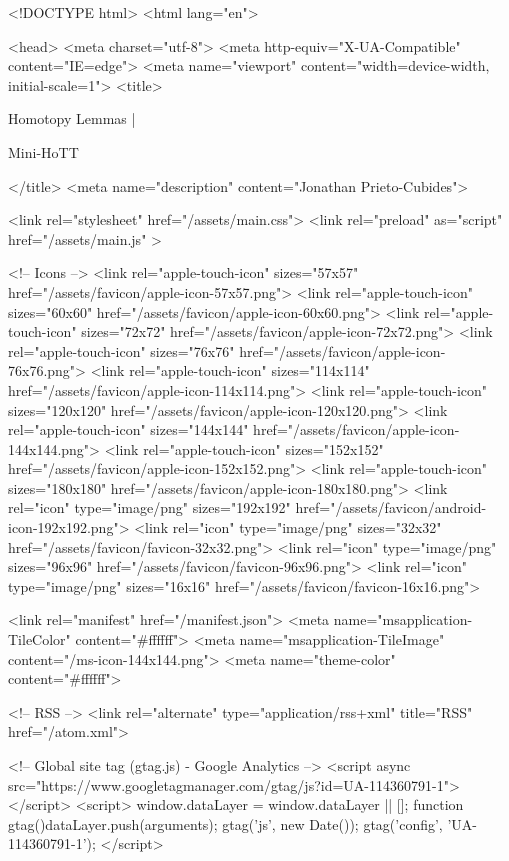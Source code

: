 <!DOCTYPE html>
<html lang="en">

<head>
  <meta charset="utf-8">
  <meta http-equiv="X-UA-Compatible" content="IE=edge">
  <meta name="viewport" content="width=device-width, initial-scale=1">
  <title>
    
      
        Homotopy Lemmas |
      
        Mini-HoTT
    
  </title>
  <meta name="description" content="Jonathan Prieto-Cubides">

  <link rel="stylesheet" href="/assets/main.css">
  <link rel="preload" as="script" href="/assets/main.js" >

  <!-- Icons -->
  <link rel="apple-touch-icon" sizes="57x57" href="/assets/favicon/apple-icon-57x57.png">
  <link rel="apple-touch-icon" sizes="60x60" href="/assets/favicon/apple-icon-60x60.png">
  <link rel="apple-touch-icon" sizes="72x72" href="/assets/favicon/apple-icon-72x72.png">
  <link rel="apple-touch-icon" sizes="76x76" href="/assets/favicon/apple-icon-76x76.png">
  <link rel="apple-touch-icon" sizes="114x114" href="/assets/favicon/apple-icon-114x114.png">
  <link rel="apple-touch-icon" sizes="120x120" href="/assets/favicon/apple-icon-120x120.png">
  <link rel="apple-touch-icon" sizes="144x144" href="/assets/favicon/apple-icon-144x144.png">
  <link rel="apple-touch-icon" sizes="152x152" href="/assets/favicon/apple-icon-152x152.png">
  <link rel="apple-touch-icon" sizes="180x180" href="/assets/favicon/apple-icon-180x180.png">
  <link rel="icon" type="image/png" sizes="192x192"  href="/assets/favicon/android-icon-192x192.png">
  <link rel="icon" type="image/png" sizes="32x32" href="/assets/favicon/favicon-32x32.png">
  <link rel="icon" type="image/png" sizes="96x96" href="/assets/favicon/favicon-96x96.png">
  <link rel="icon" type="image/png" sizes="16x16" href="/assets/favicon/favicon-16x16.png">

  <link rel="manifest" href="/manifest.json">
  <meta name="msapplication-TileColor" content="#ffffff">
  <meta name="msapplication-TileImage" content="/ms-icon-144x144.png">
  <meta name="theme-color" content="#ffffff">

  <!-- RSS -->
  <link rel="alternate" type="application/rss+xml" title="RSS" href="/atom.xml">

  <!-- Global site tag (gtag.js) - Google Analytics -->
  <script async src="https://www.googletagmanager.com/gtag/js?id=UA-114360791-1"></script>
  <script>
    window.dataLayer = window.dataLayer || [];
    function gtag(){dataLayer.push(arguments);}
    gtag('js', new Date());
    gtag('config', 'UA-114360791-1');
  </script>

